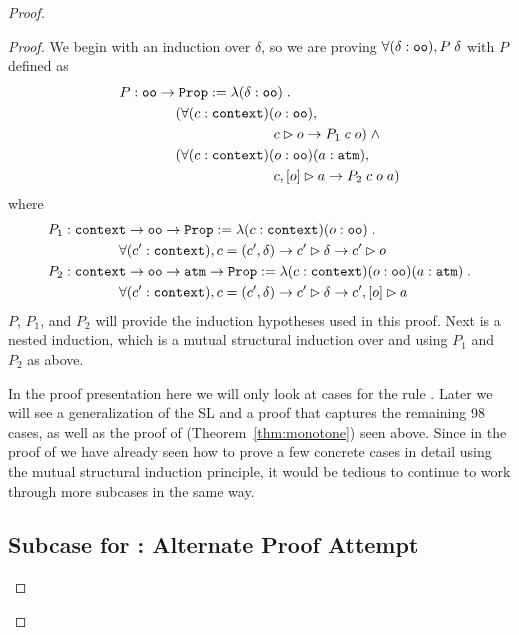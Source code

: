 \begin{proof}
\begin{proof}

We begin with an induction over $\delta$, so we are proving $\forall (\delta : \sltm{oo}), P \; \delta$ with $P$ defined as
\begin{align*}
& P : \sltm{oo} \rightarrow \hybridtm{Prop} := \lambda (\delta : \sltm{oo}) \; . \\
& \qquad\qquad (\forall (c : \sltm{context}) (o : \sltm{oo}), \\
& \qquad\qquad\qquad\qquad\qquad\quad \seqsl[c]{o} \rightarrow P_1 \; c \; o) \; \wedge \\
& \qquad\qquad (\forall (c : \sltm{context}) (o : \sltm{oo}) (a : \hybridtm{atm}), \\
& \qquad\qquad\qquad\qquad\qquad\quad \bchsl[c]{o}{a} \rightarrow P_2 \; c \; o \; a)
\end{align*}
where
\begin{align*}
P_1 &: \sltm{context} \rightarrow \sltm{oo} \rightarrow \coqtm{Prop} := \lambda (c : \sltm{context}) (o : \sltm{oo}) \; . \\
& \qquad\qquad \forall (\inddyncon{} : \sltm{context}), c = (\inddyncon{}, \delta) \rightarrow \seqsl[\inddyncon{}]{\delta} \rightarrow \seqsl[\inddyncon{}]{o} \\
P_2 &: \sltm{context} \rightarrow \sltm{oo} \rightarrow \sltm{atm} \rightarrow \coqtm{Prop} := \lambda (c : \sltm{context}) (o : \sltm{oo}) (a : \sltm{atm}) \; . \\
& \qquad\qquad \forall (\inddyncon{} : \sltm{context}), c = (\inddyncon{}, \delta) \rightarrow \seqsl[\inddyncon{}]{\delta} \rightarrow \bchsl[\inddyncon{}]{o}{a}
\end{align*}
$P$, $P_1$, and $P_2$ will provide the induction hypotheses used in this proof. Next is a nested induction, which is a mutual structural induction over  and  using $P_1$ and $P_2$ as above.

In the proof presentation here we will only look at cases for the rule \rlnmsinit{}. Later we will see a generalization of the SL and a proof that captures the remaining 98 cases, as well as the proof of  (Theorem~\ref{thm:monotone}) seen above. Since in the proof of  we have already seen how to prove a few concrete cases in detail using the mutual structural induction principle, it would be tedious to continue to work through more subcases in the same way.

\subsection{Subcase for \rlnmsinit{}: Alternate Proof Attempt}


\end{proof}
\end{proof}
